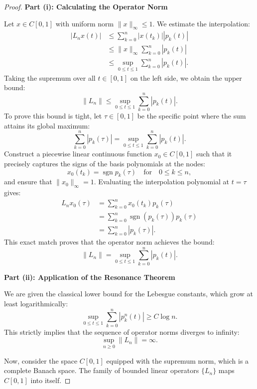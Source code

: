 \documentclass[11pt,a4paper]{article}
\theoremstyle{plain}
\theoremstyle{definition}
\begin{document}
\begin{proof}
    \textbf{Part (i): Calculating the Operator Norm} \medskip

    Let $x \in C[0,1]$ with uniform norm $\|x\|_\infty \le 1$. We estimate the interpolation:
    \[
        \begin{aligned}
            |L_n x(t)| & \le \sum_{k=0}^{n} |x(t_k)| |p_k(t)|            \\
                       & \le \|x\|_\infty \sum_{k=0}^{n} |p_k(t)|        \\
                       & \le \sup_{0\le t\le 1} \sum_{k=0}^{n} |p_k(t)|.
        \end{aligned}
    \]
    Taking the supremum over all $t \in [0,1]$ on the left side, we obtain the upper bound:
    \[
        \|L_n\| \le \sup_{0\le t\le 1} \sum_{k=0}^{n} |p_k(t)|.
    \]
    To prove this bound is tight, let $\tau \in [0,1]$ be the specific point where the sum attains its global maximum:
    \[
        \sum_{k=0}^{n} |p_k(\tau)| = \sup_{0\le t\le 1} \sum_{k=0}^{n} |p_k(t)|.
    \]
    Construct a piecewise linear continuous function $x_0 \in C[0,1]$ such that it precisely captures the signs of the basis polynomials at the nodes:
    \[
        x_0(t_k) = \operatorname{sgn} p_k(\tau) \quad \text{for} \quad 0 \le k \le n,
    \]
    and ensure that $\|x_0\|_\infty = 1$. Evaluating the interpolation polynomial at $t = \tau$ gives:
    \[
        \begin{aligned}
            L_n x_0(\tau) & = \sum_{k=0}^{n} x_0(t_k) p_k(\tau)                      \\
                          & = \sum_{k=0}^{n} \operatorname{sgn}(p_k(\tau)) p_k(\tau) \\
                          & = \sum_{k=0}^{n} |p_k(\tau)|.
        \end{aligned}
    \]
    This exact match proves that the operator norm achieves the bound:
    \[
        \|L_{n}\| = \sup_{0\le t\le 1}\sum_{k=0}^{n}|p_{k}(t)|.
    \]

    \textbf{Part (ii): Application of the Resonance Theorem} \medskip

    We are given the classical lower bound for the Lebesgue constants, which grow at least logarithmically:
    \[
        \sup_{0\le t\le 1}\sum_{k=0}^{n}|p_{k}^{n}(t)| \ge C \log n.
    \]
    This strictly implies that the sequence of operator norms diverges to infinity:
    \[
        \sup_{n \ge 0} \|L_n\| = \infty.
    \]

    Now, consider the space $C[0,1]$ equipped with the supremum norm, which is a complete Banach space. The family of bounded linear operators $\{L_n\}$ maps $C[0,1]$ into itself.


\end{proof}
\end{document}
